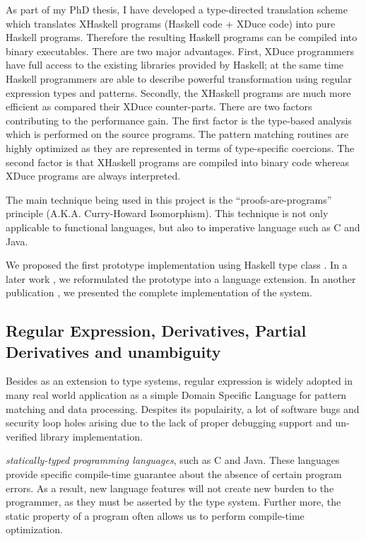 \documentclass[12pt]{article}
\theoremstyle{plain} \numberwithin{equation}{section}
\theoremstyle{definition}
\newcommand{\kl}[1]{}
\begin{document}
As part of my PhD thesis, I have developed a
type-directed translation scheme which translates XHaskell programs
(Haskell code + XDuce code) into pure Haskell programs. Therefore
the resulting Haskell programs can be compiled into binary executables.
There are two major advantages. First, XDuce programmers have full
access to the existing libraries provided by Haskell; at the same
time Haskell programmers are able to describe powerful transformation
using regular expression types and patterns. Secondly, the XHaskell
programs are much more efficient as compared their XDuce counter-parts.
There are two factors contributing to the performance gain. 
The first factor is the type-based analysis which is performed on the 
source programs. The pattern matching routines are highly optimized
as they are represented in terms of type-specific coercions. The second 
factor is that XHaskell programs are compiled into binary code whereas
XDuce programs are always interpreted. 

The main technique being used in this project is the
``proofs-are-programs'' principle (A.K.A. Curry-Howard Isomorphism). 
This technique is not only applicable  to functional
languages, but also to imperative language such as C and Java.

We proposed the first prototype implementation using Haskell type class
 \cite{semantic-subtyping}. In a later work \cite{ml-workshop05}, 
we reformulated the prototype into a language extension. 
In another publication \cite{ifl2007}, we presented the complete implementation of the system.


\subsection{Regular Expression, Derivatives, Partial Derivatives and unambiguity}

Besides as an extension to type systems, regular expression is widely adopted in many
real world application as a simple Domain Specific Language for pattern matching and data processing.
Despites its populairity, a lot of software bugs and security loop holes arising due to the
lack of proper debugging support and un-verified library implementation.

\kl{debugging}



\kl{rewriting frontier}

{\em statically-typed
programming languages}, such as C and Java. These languages
provide specific compile-time guarantee about the absence of certain
program errors. As a result, new language features will not create new
burden to the programmer, as they must be asserted by the type system.
Further more, the static property of a program often allows us 
to perform compile-time optimization. 
\end{document}
